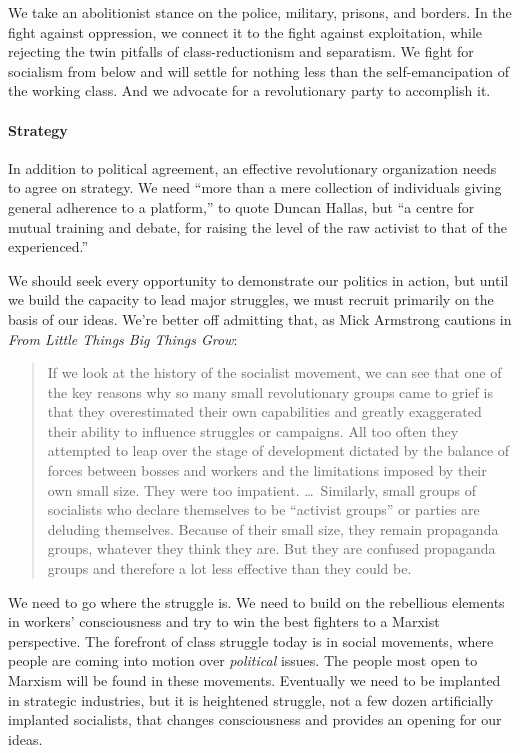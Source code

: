 We take an abolitionist stance on the police, military, prisons, and borders. In the fight against oppression, we connect it to the fight against exploitation, while rejecting the twin pitfalls of class-reductionism and separatism. We fight for socialism from below and will settle for nothing less than the self-emancipation of the working class. And we advocate for a revolutionary party to accomplish it.

\paragraph{Strategy}

In addition to political agreement, an effective revolutionary organization needs to agree on strategy. We need ``more than a mere collection of individuals giving general adherence to a platform,'' to quote Duncan Hallas, but ``a centre for mutual training and debate, for raising the level of the raw activist to that of the experienced.''

We should seek every opportunity to demonstrate our politics in action, but until we build the capacity to lead major struggles, we must recruit primarily on the basis of our ideas. We're better off admitting that, as Mick Armstrong cautions in \emph{From Little Things Big Things Grow}:

\blockquote{If we look at the history of the socialist movement, we can see that one of the key reasons why so many small revolutionary groups came to grief is that they overestimated their own capabilities and greatly exaggerated their ability to influence struggles or campaigns. All too often they attempted to leap over the stage of development dictated by the balance of forces between bosses and workers and the limitations imposed by their own small size. They were too impatient. \ldots\ Similarly, small groups of socialists who declare themselves to be ``activist groups'' or parties are deluding themselves. Because of their small size, they remain propaganda groups, whatever they think they are. But they are confused propaganda groups and therefore a lot less effective than they could be.}

We need to go where the struggle is. We need to build on the rebellious elements in workers' consciousness and try to win the best fighters to a Marxist perspective. The forefront of class struggle today is in social movements, where people are coming into motion over \emph{political} issues. The people most open to Marxism will be found in these movements. Eventually we need to be implanted in strategic industries, but it is heightened struggle, not a few dozen artificially implanted socialists, that changes consciousness and provides an opening for our ideas.

